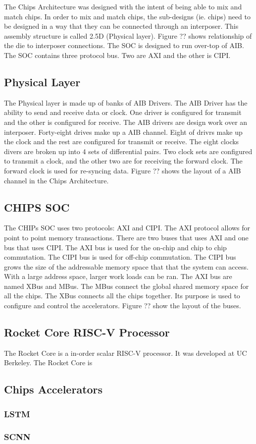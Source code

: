 \documentclass[../main.tex]{subfiles}
\begin{document}
The Chips Architecture was designed with the intent of being able to mix and match chips. In order to mix and match chips, the sub-designs (ie. chips) need to be designed in a way that they can be connected through an interposer. This assembly structure is called 2.5D (Physical layer). Figure ?? shows relationship of the die to interposer connections. The SOC is designed to run over-top of AIB. The SOC contains three protocol bus. Two are AXI and the other is CIPI.

\subsection{Physical Layer}
The Physical layer is made up of banks of AIB Drivers. The AIB Driver has the ability to send and receive data or clock. One driver is configured for transmit and the other is configured for receive. The AIB drivers are design work over an interposer. Forty-eight drives make up a AIB channel. Eight of drivrs make up the clock and the rest are configured for transmit or receive. The eight clocks divers are broken up into 4 sets of differential pairs. Two clock sets are configured to transmit a clock, and the other two are for receiving the forward clock. The forward clock is used for re-syncing data. Figure ?? shows the layout of a AIB channel in the Chips Architecture.

\subsection{CHIPS SOC}
The CHIPs SOC uses two protocols: AXI and CIPI. The AXI protocol allows for point to point memory transactions. There are two buses that uses AXI and one bus that uses CIPI. The AXI bus is used for the on-chip and chip to chip commutation. The CIPI bus is used for off-chip commutation. The CIPI bus grows the size of the addressable memory space that that the system can access. With a large address space, larger work loads can be ran. The AXI bus are named XBus and MBus. The MBus connect the global shared memory space for all the chips. The XBus connects all the chips together. Its purpose is used to configure and control the accelerators. Figure ?? show the layout of the buses.
\subsection{Rocket Core RISC-V Processor}
The Rocket Core is a in-order scalar RISC-V processor. It was developed at UC Berkeley. The Rocket Core is 
\subsection{Chips Accelerators}
\subsubsection{LSTM}
\blindtext
\subsubsection{SCNN}
\blindtext
\end{document}
